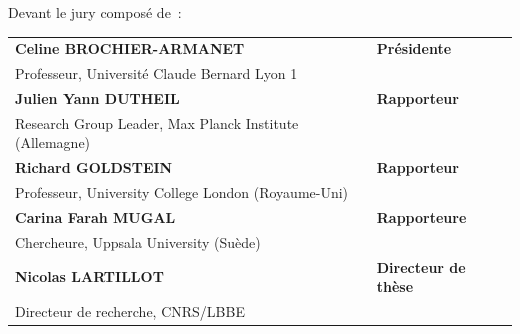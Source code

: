 Devant le jury composé de~:\\

\small {
	\begin{tabular}{ll}
		\textbf{Celine BROCHIER-ARMANET}           &\textbf{Présidente}\\
		Professeur, Université Claude Bernard Lyon 1\\
		\textbf{Julien Yann DUTHEIL}           &\textbf{Rapporteur}\\
		Research Group Leader, Max Planck Institute (Allemagne)\\
		\textbf{Richard GOLDSTEIN}           &\textbf{Rapporteur}\\
		Professeur, University College London (Royaume-Uni)\\
		\textbf{Carina Farah MUGAL}           &\textbf{Rapporteure}\\
		Chercheure, Uppsala University (Suède) \\
		\textbf{Nicolas LARTILLOT}           &\textbf{Directeur de thèse}\\
		Directeur de recherche, CNRS/LBBE\\	
	\end{tabular}
}
